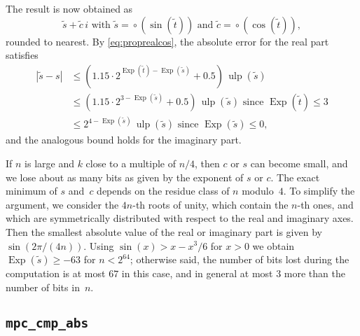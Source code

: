 \documentclass [11pt]{article}
\newcommand {\corr}[1]{{#1}}
\newcommand {\appro}[1]{\widetilde {#1}}
\newcommand {\Ulp}{{\operatorname {ulp}}}
\DeclareMathOperator{\Exp}{\operatorname {Exp}}
\newcommand {\round}{\operatorname {\circ}}
\renewcommand {\leq}{\leqslant}
\renewcommand {\geq}{\geqslant}
\begin{document}
The result is now obtained as
\[
\appro {s} + \appro {c} \, i
\text { with }
\appro {s} = \round (\sin (\appro {t}))
\text { and }
\appro {c} = \round (\cos (\appro {t})),
\]
rounded to nearest.
By \eqref {eq:proprealcos}, the absolute error for the real part satisfies
\begin {align*}
|\appro {s} - \corr {s}|
& \leq \left( 1.15 \cdot 2^{\Exp (\appro {t}) - \Exp (\appro {s})}
   + 0.5 \right) \, \Ulp (\appro {s}) \\
& \leq \left( 1.15 \cdot 2^{3 - \Exp (\appro {s})} + 0.5 \right)
   \, \Ulp (\appro {s}) \text { since } \Exp (\appro {t}) \leq 3 \\
& \leq 2^{4 - \Exp (\appro {s})} \, \Ulp (\appro {s})
   \text { since } \Exp (\appro {s}) \leq 0,
\end {align*}
and the analogous bound holds for the imaginary part.

If $n$ is large and $k$ close to a multiple of $n/4$, then $c$ or $s$
can become small, and we lose about as many bits as given by the exponent
of $s$ or $c$. The exact minimum of $s$ and~$c$ depends on the residue
class of $n$ modulo~$4$. To simplify the argument, we consider the $4 n$-th
roots of unity, which contain the $n$-th ones, and which are symmetrically
distributed with respect to the real and imaginary axes. Then the smallest
absolute value of the real or imaginary part is given by
$\sin (2 \pi / (4 n))$. Using $\sin (x) > x - x^3 / 6$ for $x > 0$
we obtain $\Exp (\appro {s}) \geq -63$ for $n < 2^{64}$; otherwise said,
the number of bits lost during the computation is at most $67$ in this
case, and in general at most $3$ more than the number of bits in~$n$.


\subsection {\texttt {mpc\_cmp\_abs}}
\end{document}
